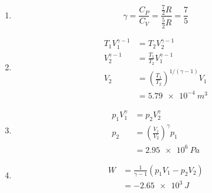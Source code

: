 \documentclass{article}
\begin{document}
\begin{enumerate}
  \item \[\gamma = \frac{C_P}{C_V} = \frac{\frac{7}{2} R}{\frac{5}{2} R} = \frac{7}{5}\]

  \item

        \begin{align*}
          T_1 V_1^{\gamma - 1} & = T_2 V_2^{\gamma - 1}                                  \\
          V_2^{\gamma - 1}     & = \frac{T_1}{T_2} V_1^{\gamma - 1}                      \\
          V_2                  & = \left( \frac{T_1}{T_2} \right)^{1 / (\gamma - 1)} V_1 \\
                               & = \qty{5.79e-4}{m^3}
        \end{align*}

  \item

        \begin{align*}
          p_1 V_1^\gamma & = p_2 V_2^\gamma                            \\
          p_2            & = \left( \frac{V_1}{V_2} \right)^\gamma p_1 \\
                         & = \qty{2.95e6}{Pa}
        \end{align*}

  \item

        \begin{align*}
          W & = \frac{1}{\gamma - 1} (p_1 V_1 - p_2 V_2) \\
            & = \qty{-2.65e3}{J}
        \end{align*}
\end{enumerate}

\subsubsection{}
\end{document}
